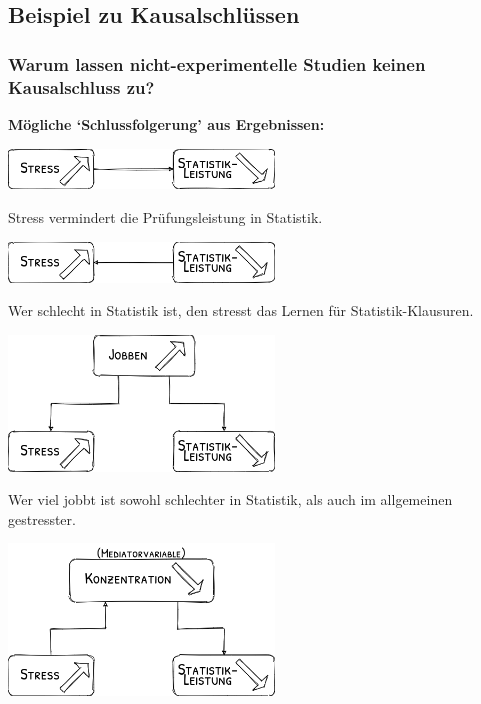 \documentclass[
]{book}
\begin{document}
\hypertarget{beispiel-zu-kausalschluxfcssen}{%
\subsection{Beispiel zu Kausalschlüssen}\label{beispiel-zu-kausalschluxfcssen}}

\hypertarget{warum-lassen-nicht-experimentelle-studien-keinen-kausalschluss-zu-1}{%
\subsubsection{Warum lassen nicht-experimentelle Studien keinen Kausalschluss zu?}\label{warum-lassen-nicht-experimentelle-studien-keinen-kausalschluss-zu-1}}

\textbf{Mögliche `Schlussfolgerung' aus Ergebnissen:}

\begin{center}\includegraphics[width=200pt]{imgs/direct_causality} \end{center}

Stress vermindert die Prüfungsleistung in Statistik.

\begin{center}\includegraphics[width=200pt]{imgs/reverse_causality} \end{center}

Wer schlecht in Statistik ist, den stresst das Lernen für Statistik-Klausuren.

\begin{center}\includegraphics[width=200pt]{imgs/confound_causality} \end{center}

Wer viel jobbt ist sowohl schlechter in Statistik, als auch im allgemeinen gestresster.

\begin{center}\includegraphics[width=200pt]{imgs/mediator_causality} \end{center}
\end{document}
